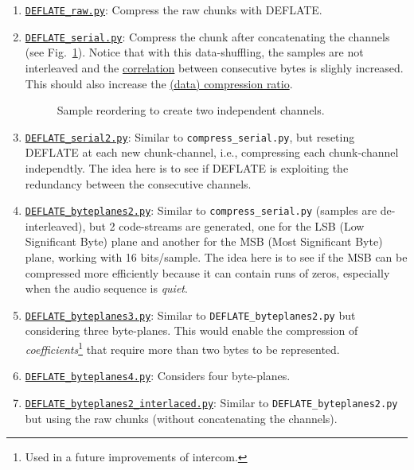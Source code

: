 \begin{enumerate}
\item
  \href{https://github.com/Tecnologias-multimedia/InterCom/blob/master/src/DEFLATE\_raw.py}{\texttt{DEFLATE\_raw.py}}:
  Compress the raw chunks with DEFLATE.
\item
  \href{https://github.com/Tecnologias-multimedia/InterCom/blob/master/src/DEFLATE\_serial.py}{\texttt{DEFLATE\_serial.py}}:
  Compress the chunk after concatenating the channels (see
  Fig.~\ref{fig:reordering}). Notice that with this data-shuffling,
  the samples are not interleaved and the
  \href{https://en.wikipedia.org/wiki/Correlation}{correlation}
  between consecutive bytes is slighly increased. This should also
  increase the
  \href{https://en.wikipedia.org/wiki/Data_compression_ratio}{(data)
    compression ratio}.
\begin{figure}
  \begin{center}
  \end{center}
  \caption{Sample reordering to create two independent channels.}
  \label{fig:reordering}
\end{figure}
\item
  \href{https://github.com/Tecnologias-multimedia/InterCom/blob/master/src/DEFLATE\_serial2.py}{\texttt{DEFLATE\_serial2.py}}:
  Similar to \verb|compress_serial.py|, but reseting DEFLATE at each
  new chunk-channel, i.e., compressing each chunk-channel
  independtly. The idea here is to see if DEFLATE is exploiting the
  redundancy between the consecutive channels.
\item
  \href{https://github.com/Tecnologias-multimedia/InterCom/blob/master/src/DEFLATE\_byteplanes2.py}{\texttt{DEFLATE\_byteplanes2.py}}:
  Similar to \verb|compress_serial.py| (samples are de-interleaved),
  but 2 code-streams are generated, one for the LSB (Low Significant
  Byte) plane and another for the MSB (Most Significant Byte) plane,
  working with 16 bits/sample. The idea here is to see if the MSB can
  be compressed more efficiently because it can contain runs of zeros,
  especially when the audio sequence is \emph{quiet}.
\item
  \href{https://github.com/Tecnologias-multimedia/InterCom/blob/master/src/DEFLATE\_byteplanes3.py}{\texttt{DEFLATE\_byteplanes3.py}}:
  Similar to \verb|DEFLATE_byteplanes2.py| but considering three
  byte-planes. This would enable the compression of
  \emph{coefficients}\footnote{Used in a future improvements of
  intercom.} that require more than two bytes to be represented.
\item
  \href{https://github.com/Tecnologias-multimedia/InterCom/blob/master/src/DEFLATE\_byteplanes4.py}{\texttt{DEFLATE\_byteplanes4.py}}:
  Considers four byte-planes.
\item
  \href{https://github.com/Tecnologias-multimedia/InterCom/blob/master/src/DEFLATE_byteplanes2\_interlaced.py}{\texttt{DEFLATE\_byteplanes2\_interlaced.py}}:
  Similar to \verb|DEFLATE_byteplanes2.py| but using the raw chunks
  (without concatenating the channels).
\end{enumerate}

